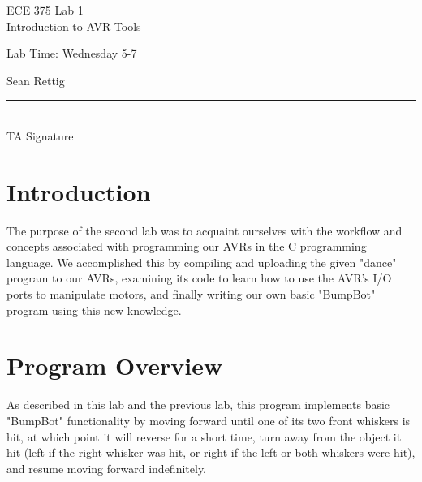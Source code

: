 \documentclass[12pt,letterpaper]{article}
\begin{document}
\begin{titlepage}
    \vspace*{4cm}
    \begin{flushright}
    {\huge
        ECE 375 Lab 1\\[1cm]
    }
    {\large
        Introduction to AVR Tools
    }
    \end{flushright}
    \begin{flushleft}
    Lab Time: Wednesday 5-7
    \end{flushleft}
    \begin{flushright}
    Sean Rettig
    \vfill
    \rule{5in}{.5mm}\\
    TA Signature
    \end{flushright}

\end{titlepage}

\section{Introduction}

The purpose of the second lab was to acquaint ourselves with the workflow and
concepts associated with programming our AVRs in the C programming language.
We accomplished this by compiling and uploading the given "dance" program to
our AVRs, examining its code to learn how to use the AVR's I/O ports to
manipulate motors, and finally writing our own basic "BumpBot" program using
this new knowledge.

\section{Program Overview}

As described in this lab and the previous lab, this program implements basic
"BumpBot" functionality by moving forward until one of its two front whiskers
is hit, at which point it will reverse for a short time, turn away from the
object it hit (left if the right whisker was hit, or right if the left or both
whiskers were hit), and resume moving forward indefinitely.
\end{document}
